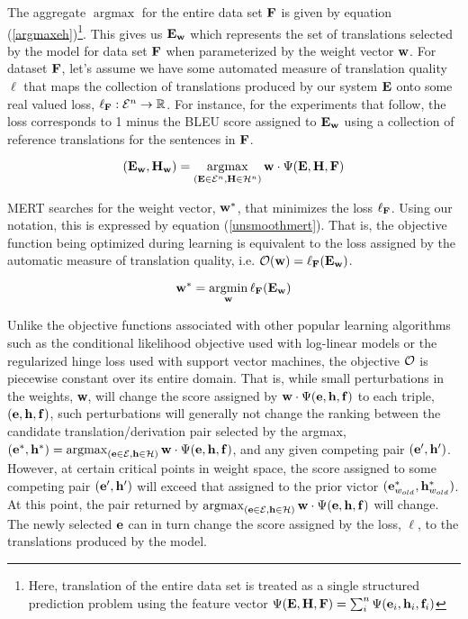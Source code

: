 \documentclass[11pt]{article}
\DeclareMathOperator*{\argmax}{argmax}
\DeclareMathOperator*{\argmin}{argmin}
\begin{document}
The aggregate $\argmax$ for the entire data set ${\bf F}$ is given by equation (\ref{argmaxeh})\footnote{Here, translation of the entire data set is treated as a single structured prediction problem using the feature vector  $\Psi({\bf E}, {\bf H}, {\bf F}) = \sum_i^n \Psi({\bf e}_i, {\bf h}_i, {\bf f}_i)$}. This gives us ${\bf E}_{\bf w}$ which represents the set of translations selected by the model for data set ${\bf F}$ when parameterized by the weight vector ${\bf w}$. For dataset ${\bf F}$, let's assume we have some automated measure of translation quality $\ell$ that maps the collection of translations produced by our system ${\bf E}$ onto some real valued loss, $\ell_{\bf F}:{\cal E}^n\rightarrow \mathbb{R}$. For instance, for the experiments that follow, the loss corresponds to 1 minus the BLEU score assigned to ${\bf E}_{\bf w}$ using a collection of reference translations for the sentences in ${\bf F}$. 

\begin{equation}
({\bf E}_{\bf w}, {\bf H}_{\bf w}) = \argmax_{({\bf E} \in {\cal E}^n, {\bf H} \in {\cal H}^n)} {\bf w} \cdot \Psi({\bf E}, {\bf H}, {\bf F})
\label{argmaxeh}
\end{equation}

MERT searches for the weight vector, ${\bf w}^*$, that minimizes the loss $\ell_{\bf F}$. Using our notation, this is expressed by equation (\ref{unsmoothmert}). That is, the objective function being optimized during learning is equivalent to the loss assigned by the automatic measure of translation quality, i.e. ${\cal O}({\bf w}) = \ell_{\bf F} ({\bf E}_{\bf w})$.

\begin{equation}
{\bf w}^* = \argmin_{\bf w} \ell_{\bf F} ({\bf E}_{\bf w}) 
\label{unsmoothmert}
\end{equation}

Unlike the objective functions associated with other popular learning algorithms such as the conditional likelihood objective used with log-linear models or the regularized hinge loss used with support vector machines, the objective ${\cal O}$ is piecewise constant over its entire domain. That is, while small perturbations in the weights, {\bf w}, will change the score assigned by ${\bf w} \cdot \Psi({\bf e}, {\bf h}, {\bf f})$ to each triple, $({\bf e}, {\bf h}, {\bf f})$, such perturbations will generally not change the ranking between the candidate translation/derivation pair selected by the argmax,  $({\bf e}^*, {\bf h}^*) = \argmax_{({\bf e} \in {\cal E}, {\bf h} \in {\cal H})} {\bf w} \cdot \Psi({\bf e}, {\bf h}, {\bf f})$, and any given competing pair $({\bf e}^\prime, {\bf h}^\prime)$. However, at certain critical points in weight space, the score assigned to some competing pair $({\bf e}^\prime, {\bf h}^\prime)$ will exceed that assigned to the prior victor  $({\bf e}^*_{w_{old}}, {\bf h}^*_{w_{old}})$. At this point, the pair returned by $\argmax_{({\bf e} \in {\cal E}, {\bf h} \in {\cal H})} {\bf w} \cdot \Psi({\bf e}, {\bf h}, {\bf f})$ will change. The newly selected ${\bf e}$  can in turn change the score assigned by the loss, $\ell$, to the translations produced by the model.
\end{document}

